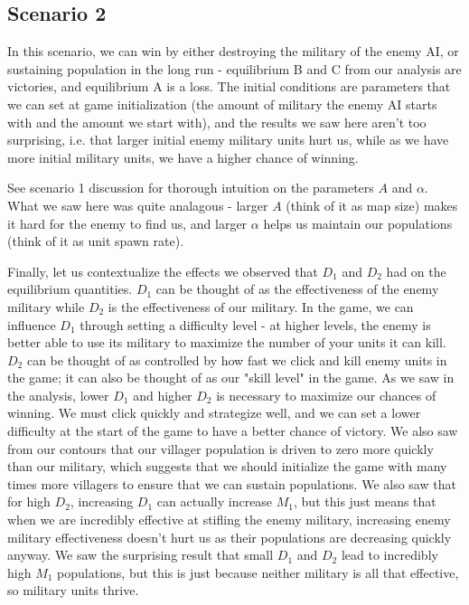 \documentclass[12pt]{article}
\begin{document}
\subsection{Scenario 2}
In this scenario, we can win by either destroying the military of the enemy AI, or sustaining population in the long run - equilibrium B and C from our analysis are victories, and equilibrium A is a loss. The initial conditions are parameters that we can set at game initialization (the amount of military the enemy AI starts with and the amount we start with), and the results we saw here aren't too surprising, i.e. that larger initial enemy military units hurt us, while as we have more initial military units, we have a higher chance of winning. \par
See scenario 1 discussion for thorough intuition on the parameters $A$ and $\alpha$. What we saw here was quite analagous - larger $A$ (think of it as map size) makes it hard for the enemy to find us, and larger $\alpha$ helps us maintain our populations (think of it as unit spawn rate). \par
Finally, let us contextualize the effects we observed that $D_1$ and $D_2$ had on the equilibrium quantities. $D_1$ can be thought of as the effectiveness of the enemy military while $D_2$ is the effectiveness of our military. In the game, we can influence $D_1$ through setting a difficulty level - at higher levels, the enemy is better able to use its military to maximize the number of your units it can kill. $D_2$ can be thought of as controlled by how fast we click and kill enemy units in the game; it can also be thought of as our "skill level" in the game. As we saw in the analysis, lower $D_1$ and higher $D_2$ is necessary to maximize our chances of winning. We must click quickly and strategize well, and we can set a lower difficulty at the start of the game to have a better chance of victory. We also saw from our contours that our villager population is driven to zero more quickly than our military, which suggests that we should initialize the game with many times more villagers to ensure that we can sustain populations. We also saw that for high $D_2$, increasing $D_1$ can actually increase $M_1$, but this just means that when we are incredibly effective at stifling the enemy military, increasing enemy military effectiveness doesn't hurt us as their populations are decreasing quickly anyway. We saw the surprising result that small $D_1$ and $D_2$ lead to incredibly high $M_1$ populations, but this is just because neither military is all that effective, so military units thrive. 
\end{document}
